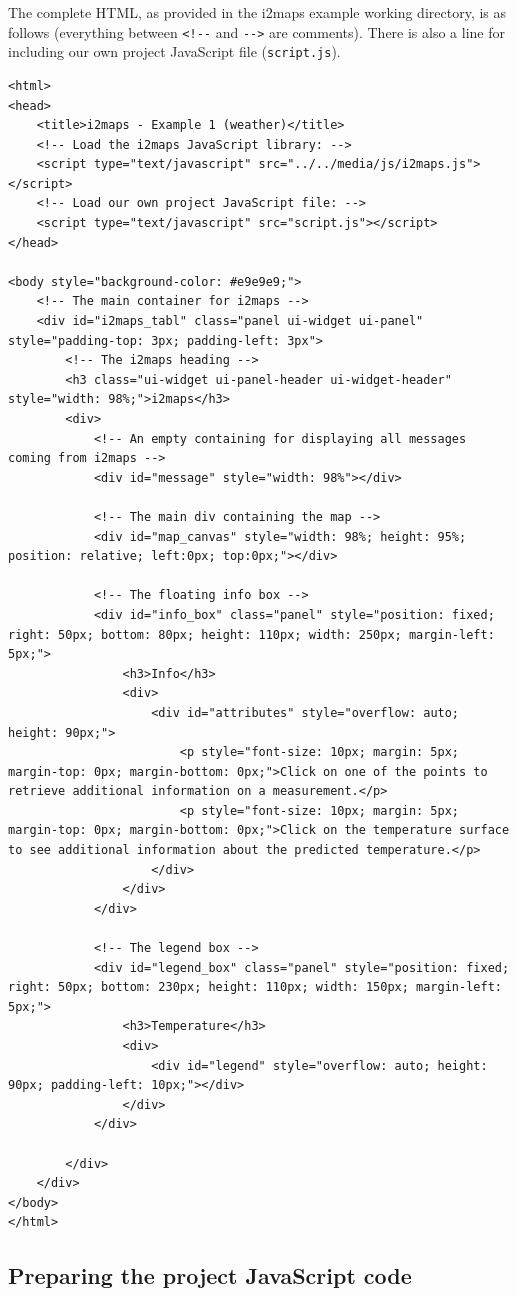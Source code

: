 \documentclass[11pt]{article}
\begin{document}
The complete HTML, as provided in the i2maps example working directory, is as follows (everything between \verb=<!--= and \verb=-->= are comments). There is also a line for including our own project JavaScript file (\verb=script.js=).

\begin{lstlisting}
<html>
<head>
	<title>i2maps - Example 1 (weather)</title>
	<!-- Load the i2maps JavaScript library: -->
	<script type="text/javascript" src="../../media/js/i2maps.js"></script>
	<!-- Load our own project JavaScript file: -->
	<script type="text/javascript" src="script.js"></script>
</head>

<body style="background-color: #e9e9e9;">
	<!-- The main container for i2maps -->
	<div id="i2maps_tabl" class="panel ui-widget ui-panel" style="padding-top: 3px; padding-left: 3px">
		<!-- The i2maps heading -->
		<h3 class="ui-widget ui-panel-header ui-widget-header" style="width: 98%;">i2maps</h3>
		<div>
			<!-- An empty containing for displaying all messages coming from i2maps -->
			<div id="message" style="width: 98%"></div>
			
			<!-- The main div containing the map -->
			<div id="map_canvas" style="width: 98%; height: 95%; position: relative; left:0px; top:0px;"></div>
			
			<!-- The floating info box -->
			<div id="info_box" class="panel" style="position: fixed; right: 50px; bottom: 80px; height: 110px; width: 250px; margin-left: 5px;">
				<h3>Info</h3>
				<div>
					<div id="attributes" style="overflow: auto; height: 90px;">
						<p style="font-size: 10px; margin: 5px; margin-top: 0px; margin-bottom: 0px;">Click on one of the points to retrieve additional information on a measurement.</p>
						<p style="font-size: 10px; margin: 5px; margin-top: 0px; margin-bottom: 0px;">Click on the temperature surface to see additional information about the predicted temperature.</p>
					</div>
				</div>
			</div>
			
			<!-- The legend box -->
			<div id="legend_box" class="panel" style="position: fixed; right: 50px; bottom: 230px; height: 110px; width: 150px; margin-left: 5px;">
				<h3>Temperature</h3>
				<div>
					<div id="legend" style="overflow: auto; height: 90px; padding-left: 10px;"></div>
				</div>
			</div>	
					
		</div>
	</div>
</body>
</html>
\end{lstlisting}




\subsection{Preparing the project JavaScript code}
\end{document}
